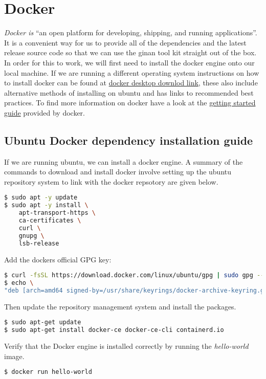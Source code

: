 \chapter{Docker}
\label{ch:docker}
\textit{Docker is} ``an open platform for developing, shipping, and running applications''. It is a convenient way for us to provide all of the dependencies and the latest release source code so that we can use the ginan tool kit straight out of the box.
%
In order for this to work, we will first need to install the docker engine onto our local machine. If we are running a different operating system instructions on how to install docker can be found at \href{https://docs.docker.com/get-docker/}{docker desktop downlod link}, these also include alternative methods of installing on ubuntu and has links to recommended best practices.
%
To find more information on docker have a look at the \href{https://docs.docker.com/get-started/}{getting started guide} provided by docker.
%
\section{Ubuntu Docker dependency installation guide}
If we are running ubuntu, we can install a docker engine. A summary of the commands to download and install docker involve setting up the ubuntu repository system to link with the docker repsotory are given below.

\begin{lstlisting}[language=bash]
$ sudo apt -y update
$ sudo apt -y install \
    apt-transport-https \
    ca-certificates \
    curl \
    gnupg \
    lsb-release
\end{lstlisting}

Add the dockers official GPG key:
\begin{lstlisting}[language=bash]
$ curl -fsSL https://download.docker.com/linux/ubuntu/gpg | sudo gpg --dearmor -o /usr/share/keyrings/docker-archive-keyring.gpg
$ echo \
"deb [arch=amd64 signed-by=/usr/share/keyrings/docker-archive-keyring.gpg] https://download.docker.com/linux/ubuntu $(lsb_release -cs) stable" | sudo tee /etc/apt/sources.list.d/docker.list > /dev/null
\end{lstlisting}
%
Then update the repository management system and install the packages.
%
\begin{lstlisting}[language=bash]
$ sudo apt-get update
$ sudo apt-get install docker-ce docker-ce-cli containerd.io
\end{lstlisting}

Verify that the Docker engine is installed correctly by running the \emph{hello-world} image.
\begin{lstlisting}[language=bash]
$ docker run hello-world
\end{lstlisting}

